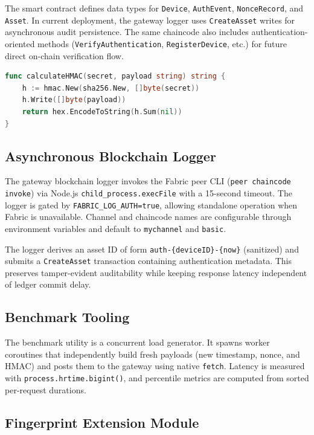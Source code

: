 \documentclass[conference]{IEEEtran}
\begin{document}
The smart contract defines data types for \texttt{Device}, \texttt{AuthEvent}, \texttt{NonceRecord}, and \texttt{Asset}. In current deployment, the gateway logger uses \texttt{CreateAsset} writes for asynchronous audit persistence. The same chaincode also includes authentication-oriented methods (\texttt{VerifyAuthentication}, \texttt{RegisterDevice}, etc.) for future direct on-chain verification flow.

\begin{lstlisting}[language=Go,caption={HMAC helper in smart contract}]
func calculateHMAC(secret, payload string) string {
    h := hmac.New(sha256.New, []byte(secret))
    h.Write([]byte(payload))
    return hex.EncodeToString(h.Sum(nil))
}
\end{lstlisting}

\subsection{Asynchronous Blockchain Logger}

The gateway blockchain logger invokes the Fabric peer CLI (\texttt{peer chaincode invoke}) via Node.js \texttt{child\_process.execFile} with a 15-second timeout. The logger is gated by \texttt{FABRIC\_LOG\_AUTH=true}, allowing standalone operation when Fabric is unavailable. Channel and chaincode names are configurable through environment variables and default to \texttt{mychannel} and \texttt{basic}.

The logger derives an asset ID of form \texttt{auth-\{deviceID\}-\{now\}} (sanitized) and submits a \texttt{CreateAsset} transaction containing authentication metadata. This preserves tamper-evident auditability while keeping response latency independent of ledger commit delay.

\subsection{Benchmark Tooling}

The benchmark utility is a concurrent load generator. It spawns worker coroutines that independently build fresh payloads (new timestamp, nonce, and HMAC) and posts them to the gateway using native \texttt{fetch}. Latency is measured with \texttt{process.hrtime.bigint()}, and percentile metrics are computed from sorted per-request durations.

\subsection{Fingerprint Extension Module}
\end{document}
